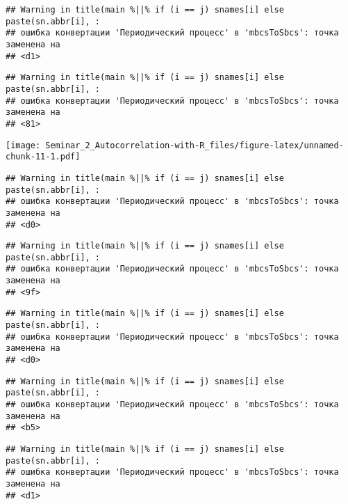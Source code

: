 \documentclass[
]{article}
\newenvironment{Shaded}{\begin{snugshade}}{\end{snugshade}}
\newcommand{\AttributeTok}[1]{\textcolor[rgb]{0.13,0.29,0.53}{#1}}
\newcommand{\DecValTok}[1]{\textcolor[rgb]{0.00,0.00,0.81}{#1}}
\newcommand{\FunctionTok}[1]{\textcolor[rgb]{0.13,0.29,0.53}{\textbf{#1}}}
\newcommand{\NormalTok}[1]{#1}
\newcommand{\SpecialCharTok}[1]{\textcolor[rgb]{0.81,0.36,0.00}{\textbf{#1}}}
\newcommand{\StringTok}[1]{\textcolor[rgb]{0.31,0.60,0.02}{#1}}
\begin{document}
\begin{verbatim}
## Warning in title(main %||% if (i == j) snames[i] else paste(sn.abbr[i], :
## ошибка конвертации 'Периодический процесс' в 'mbcsToSbcs': точка заменена на
## <d1>
\end{verbatim}

\begin{verbatim}
## Warning in title(main %||% if (i == j) snames[i] else paste(sn.abbr[i], :
## ошибка конвертации 'Периодический процесс' в 'mbcsToSbcs': точка заменена на
## <81>
\end{verbatim}

\texttt{[image: Seminar\_2\_Autocorrelation-with-R\_files/figure-latex/unnamed-chunk-11-1.pdf]}

\begin{Shaded}
\end{Shaded}

\begin{verbatim}
## Warning in title(main %||% if (i == j) snames[i] else paste(sn.abbr[i], :
## ошибка конвертации 'Периодический процесс' в 'mbcsToSbcs': точка заменена на
## <d0>
\end{verbatim}

\begin{verbatim}
## Warning in title(main %||% if (i == j) snames[i] else paste(sn.abbr[i], :
## ошибка конвертации 'Периодический процесс' в 'mbcsToSbcs': точка заменена на
## <9f>
\end{verbatim}

\begin{verbatim}
## Warning in title(main %||% if (i == j) snames[i] else paste(sn.abbr[i], :
## ошибка конвертации 'Периодический процесс' в 'mbcsToSbcs': точка заменена на
## <d0>
\end{verbatim}

\begin{verbatim}
## Warning in title(main %||% if (i == j) snames[i] else paste(sn.abbr[i], :
## ошибка конвертации 'Периодический процесс' в 'mbcsToSbcs': точка заменена на
## <b5>
\end{verbatim}

\begin{verbatim}
## Warning in title(main %||% if (i == j) snames[i] else paste(sn.abbr[i], :
## ошибка конвертации 'Периодический процесс' в 'mbcsToSbcs': точка заменена на
## <d1>
\end{verbatim}
\end{document}
